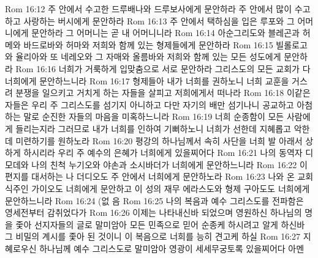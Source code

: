 Rom 16:12  주 안에서 수고한 드루배나와 드루보사에게 문안하라 주 안에서 많이 수고하고 사랑하는 버시에게 문안하라
Rom 16:13  주 안에서 택하심을 입은 루포와 그 어머니에게 문안하라 그 어머니는 곧 내 어머니니라
Rom 16:14  아순그리도와 블레곤과 허메와 바드로바와 허마와 저희와 함께 있는 형제들에게 문안하라
Rom 16:15  빌롤로고와 율리아와 또 네레오와 그 자매와 올름바와 저희와 함께 있는 모든 성도에게 문안하라
Rom 16:16  너희가 거룩하게 입맞춤으로 서로 문안하라 그리스도의 모든 교회가 다 너희에게 문안하느니라
Rom 16:17  형제들아 내가 너희를 권하노니 너희 교훈을 거스려 분쟁을 일으키고 거치게 하는 자들을 살피고 저희에게서 떠나라
Rom 16:18  이같은 자들은 우리 주 그리스도를 섬기지 아니하고 다만 자기의 배만 섬기나니 공교하고 아첨하는 말로 순진한 자들의 마음을 미혹하느니라
Rom 16:19  너희 순종함이 모든 사람에게 들리는지라 그러므로 내가 너희를 인하여 기뻐하노니 너희가 선한데 지혜롭고 악한데 미련하기를 원하노라
Rom 16:20  평강의 하나님께서 속히 사단을 너희 발 아래서 상하게 하시리라 우리 주 예수의 은혜가 너희에게 있을찌어다
Rom 16:21  나의 동역자 디모데와 나의 친척 누기오와 야손과 소시바더가 너희에게 문안하느니라
Rom 16:22  이 편지를 대서하는 나 더디오도 주 안에서 너희에게 문안하노라
Rom 16:23  나와 온 교회 식주인 가이오도 너희에게 문안하고 이 성의 재무 에라스도와 형제 구아도도 너희에게 문안하느니라
Rom 16:24  (없 음
Rom 16:25  나의 복음과 예수 그리스도를 전파함은 영세전부터 감취었다가
Rom 16:26  이제는 나타내신바 되었으며 영원하신 하나님의 명을 좇아 선지자들의 글로 말미암아 모든 민족으로 믿어 순종케 하시려고 알게 하신바 그 비밀의 계시를 좇아 된 것이니 이 복음으로 너희를 능히 견고케 하실
Rom 16:27  지혜로우신 하나님께 예수 그리스도로 말미암아 영광이 세세무궁토록 있을찌어다 아멘


